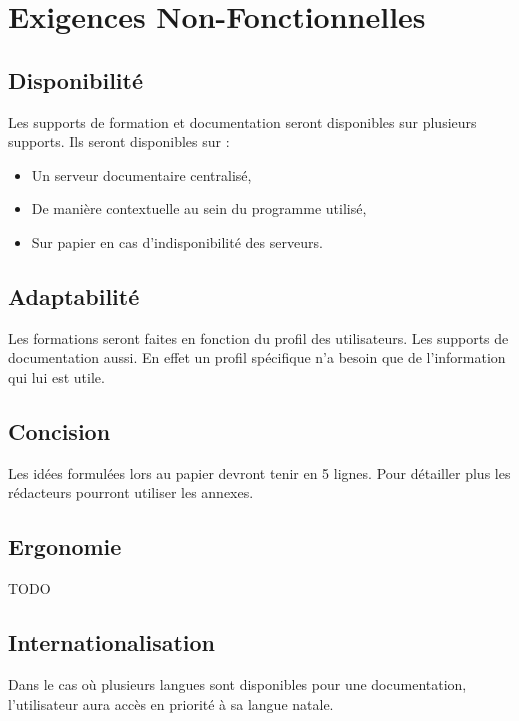 \section{Exigences Non-Fonctionnelles}

\subsection{Disponibilité}

Les supports de formation et documentation seront disponibles sur plusieurs supports.
Ils seront disponibles sur : 
\begin{itemize}
\item Un serveur documentaire centralisé,
\item De manière contextuelle au sein du programme utilisé,
\item Sur papier en cas d'indisponibilité des serveurs.
\end{itemize}

\subsection{Adaptabilité}

Les formations seront faites en fonction du profil des utilisateurs. 
Les supports de documentation aussi. En effet un profil spécifique n'a besoin
que de l'information qui lui est utile.

\subsection{Concision}

Les idées formulées lors au papier devront tenir en 5 lignes. Pour détailler plus
les rédacteurs pourront utiliser les annexes.

\subsection{Ergonomie}

TODO

\subsection{Internationalisation}

Dans le cas où plusieurs langues sont disponibles pour une documentation, l'utilisateur
aura accès en priorité à sa langue natale.
